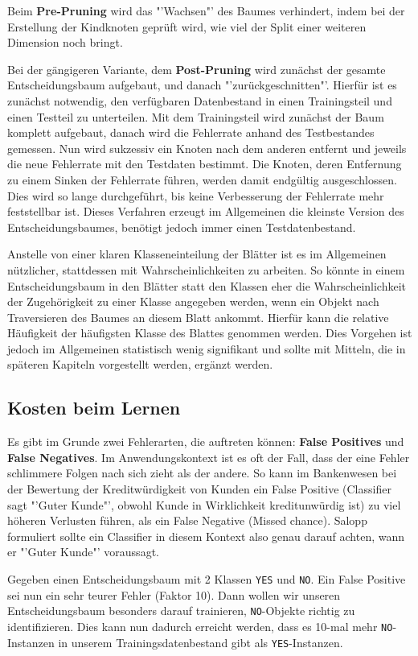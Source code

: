 Beim \textbf{Pre-Pruning} wird das "'Wachsen"' des Baumes verhindert, indem bei der
Erstellung der Kindknoten geprüft wird, wie viel der Split einer weiteren Dimension
noch bringt. 

Bei der gängigeren Variante, dem \textbf{Post-Pruning} wird zunächst der gesamte
Entscheidungsbaum aufgebaut, und danach "'zurückgeschnitten"'. Hierfür ist es
zunächst notwendig, den verfügbaren Datenbestand in einen Trainingsteil und einen
Testteil zu unterteilen. Mit dem Trainingsteil wird zunächst der Baum komplett
aufgebaut, danach wird die Fehlerrate anhand des Testbestandes gemessen. Nun wird
sukzessiv ein Knoten nach dem anderen entfernt und jeweils die neue Fehlerrate mit den
Testdaten bestimmt. Die Knoten, deren Entfernung zu einem Sinken der Fehlerrate führen,
werden damit endgültig ausgeschlossen. Dies wird so lange durchgeführt, bis keine
Verbesserung der Fehlerrate mehr feststellbar ist. Dieses Verfahren erzeugt im
Allgemeinen die kleinste Version des Entscheidungsbaumes, benötigt jedoch immer
einen Testdatenbestand.

Anstelle von einer klaren Klasseneinteilung der Blätter ist es im Allgemeinen
nützlicher, stattdessen mit Wahrscheinlichkeiten zu arbeiten. So könnte in
einem Entscheidungsbaum in den Blätter statt den Klassen eher die Wahrscheinlichkeit
der Zugehörigkeit zu einer Klasse angegeben werden, wenn ein Objekt nach Traversieren
des Baumes an diesem Blatt ankommt. Hierfür kann die relative Häufigkeit der 
häufigsten Klasse des Blattes genommen werden. Dies Vorgehen ist jedoch
im Allgemeinen statistisch wenig signifikant und sollte mit Mitteln, die in 
späteren Kapiteln vorgestellt werden, ergänzt werden.

\subsection{Kosten beim Lernen}
Es gibt im Grunde zwei Fehlerarten, die auftreten können: \textbf{False Positives} 
und \textbf{False Negatives}. Im Anwendungskontext ist es oft der Fall, dass der
eine Fehler schlimmere Folgen nach sich zieht als der andere. So kann im 
Bankenwesen bei der Bewertung der Kreditwürdigkeit von Kunden ein False Positive
(Classifier sagt "'Guter Kunde"', obwohl Kunde in Wirklichkeit kreditunwürdig ist)
zu viel höheren Verlusten führen, als ein False Negative (Missed chance). Salopp
formuliert sollte ein Classifier in diesem Kontext also genau darauf achten,
wann er "'Guter Kunde"' voraussagt.

Gegeben einen Entscheidungsbaum mit 2 Klassen \texttt{YES} und \texttt{NO}. Ein
False Positive sei nun ein sehr teurer Fehler (Faktor 10). Dann wollen wir unseren
Entscheidungsbaum besonders darauf trainieren, \texttt{NO}-Objekte richtig zu
identifizieren. Dies kann nun dadurch erreicht werden, dass es 10-mal mehr 
\texttt{NO}-Instanzen in unserem Trainingsdatenbestand gibt als \texttt{YES}-Instanzen.

